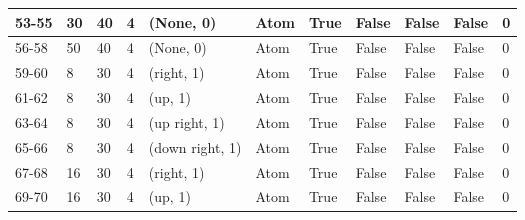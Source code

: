 \begin{longtable}{|C{0.9cm}|C{0.8cm}|C{0.8cm}|C{0.8cm}|C{3cm}|C{1.5cm}|C{1.5cm}|C{0.8cm}|C{0.8cm}|C{1cm}|C{1cm}|}
    53-55 &  30 &  40 &  4 & (None, 0) & Atom & True & False & False & False & 0 \\ \hline

    56-58 &  50 &  40 &  4 & (None, 0) & Atom & True & False & False & False & 0 \\ \hline
    
    
    59-60 &  8 &  30 &  4 & (right, 1) & Atom & True & False & False & False & 0 \\ \hline

    61-62 &  8 &  30 &  4 & (up, 1) & Atom & True & False & False & False & 0 \\ \hline

    63-64 &  8 &  30 &  4 & (up right, 1) & Atom & True & False & False & False & 0 \\ \hline

    65-66 &  8 &  30 &  4 & (down right, 1) & Atom & True & False & False & False & 0 \\ \hline

    67-68 &  16 &  30 &  4 & (right, 1) & Atom & True & False & False & False & 0 \\ \hline

    69-70 &  16 &  30 &  4 & (up, 1) & Atom & True & False & False & False & 0 \\ \hline


\end{longtable}
